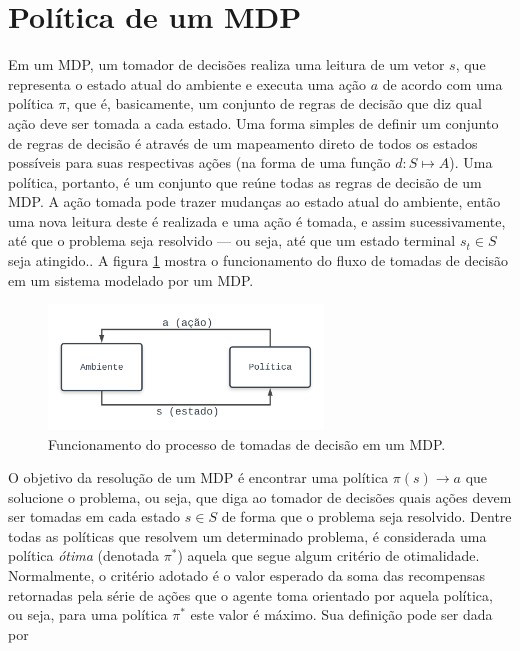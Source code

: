 \documentclass[cic,tc]{iiufrgs}
\begin{document}
\section{Política de um MDP}
\label{policy}
Em um MDP, um tomador de decisões realiza uma leitura de um vetor $s$, que
representa o estado atual do ambiente e executa uma ação $a$ de acordo com uma
política $\pi$, que
é, basicamente, um conjunto de regras de decisão que diz qual ação deve ser
tomada a cada estado. Uma forma simples de definir um conjunto de regras de
decisão é através de um mapeamento direto de todos os estados possíveis para
suas respectivas ações (na forma de uma função $d: S \mapsto A$). Uma política,
portanto, é um conjunto que reúne todas as regras de decisão de um MDP.
A ação tomada pode trazer mudanças ao estado atual do ambiente, então uma nova
leitura deste é realizada e uma ação é tomada, e assim sucessivamente, até que o
problema seja resolvido --- ou seja, até que um estado terminal $s_t \in S$ seja
atingido.. A figura \ref{fig:fluxo_politica} mostra o funcionamento do fluxo de
tomadas de decisão em um sistema modelado por um MDP.

\begin{figure}[h]
    \caption{Funcionamento do processo de tomadas de decisão em um MDP.}
    \begin{center}
      \includegraphics[width=0.65\textwidth]{fluxo_politica_.png}
    \end{center}
    \label{fig:fluxo_politica}
\end{figure}

O objetivo da resolução de um MDP é encontrar uma política $\pi(s) \rightarrow a$
que solucione o problema, ou seja, que diga ao tomador de decisões quais ações
devem ser tomadas em cada estado $s \in S$ de forma que o problema seja
resolvido. Dentre todas as políticas que resolvem um determinado problema, é
considerada uma política \textit{ótima} (denotada $\pi^*$) aquela que segue
algum critério de otimalidade. Normalmente, o critério adotado é o valor
esperado da soma das recompensas retornadas pela série de ações que o agente
toma orientado por aquela política, ou seja, para uma política $\pi^*$ este
valor é máximo. Sua definição pode ser dada por
\end{document}
